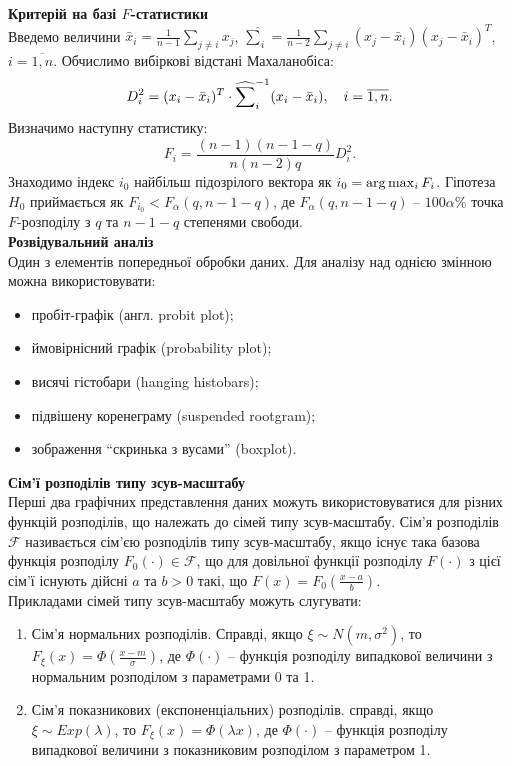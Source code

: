 \textbf{Критерій на базі $F$-статистики} \\

Введемо величини $\bar{x}_i = \frac{1}{n - 1} \sum_{j \ne i} x_j$, $\widehat{\sum}_i = \frac{1}{n - 2} \sum_{j \ne i} (x_j - \bar{x}_i) (x_j - \bar{x}_i)^T$, $i = \overline{1,n}$. Обчислимо вибіркові відстані Махаланобіса: \[ D_i^2 = (x_i - \bar{x}_i)^T \cdot \widehat{\displaystyle\sum\limits}_i^{-1} (x_i - \bar{x}_i), \quad i = \overline{1, n}. \] Визначимо наступну статистику: \[ F_i = \dfrac{(n - 1)(n - 1 - q)}{n(n - 2)q} D_i^2. \] Знаходимо індекс $i_0$ найбільш підозрілого вектора як $i_0 = \arg\max_i F_i$. Гіпотеза $H_0$ приймається як $F_{i_0} < F_\alpha(q, n - 1 - q)$, де $F_\alpha(q, n - 1 - q)$ -- $100\alpha\%$ точка $F$-розподілу з $q$ та $n - 1 - q$ степенями свободи. \\

\textbf{Розвідувальний аналіз} \\

Один з елементів попередньої обробки даних. Для аналізу над однією змінною можна використовувати:
\begin{itemize}
    \item пробіт-графік (англ. probit plot);
    \item ймовірнісний графік (probability plot);
    \item висячі гістобари (hanging histobars);
    \item підвішену коренеграму (suspended rootgram);
    \item зображення ``скринька з вусами'' (boxplot).
\end{itemize}

\textbf{Сім'ї розподілів типу зсув-масштабу} \\

Перші два графічних представлення даних можуть використовуватися для різних функцій розподілів, що належать до сімей типу зсув-масштабу. Сім'я розподілів $\mathcal{F}$ називається сім'єю розподілів типу зсув-масштабу, якщо існує така базова функція розподілу $F_0(\cdot)\in \mathcal{F}$, що для довільної функції розподілу $F(\cdot)$ з цієї сім'ї існують дійсні $a$ та $b > 0$ такі, що $F(x) = F_0 \left( \frac{x - a}{b} \right)$. \\

Прикладами сімей типу зсув-масштабу можуть слугувати:
\begin{enumerate}
    \item Сім'я нормальних розподілів. Справді, якщо $\xi \sim N(m, \sigma^2)$, то $F_\xi(x) = \Phi(\frac{x - m}{\sigma})$, де $\Phi(\cdot)$ -- функція розподілу випадкової величини з нормальним розподілом з параметрами 0 та 1.
    \item Сім'я показникових (експоненціальних) розподілів. справді, якщо $\xi \sim Exp(\lambda)$, то $F_\xi(x) = \Phi(\lambda x)$, де $\Phi(\cdot)$ -- функція розподілу випадкової величини з показниковим розподілом з параметром 1.
\end{enumerate}

